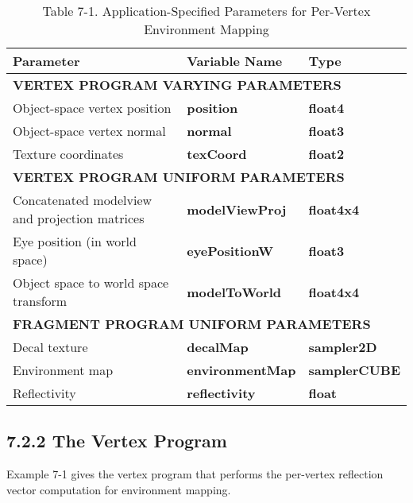 \documentclass[../main.tex]{subfiles}
\begin{document}
\begin{table}
\centering
\begin{tabular}{ p{7cm} p{3cm} p{3cm} } 

Parameter & Variable Name & Type \\
\hline

\multicolumn{3}{p{10cm}}{\textbf{VERTEX PROGRAM VARYING PARAMETERS}}\\

Object-space vertex position & \textbf{position} & \textbf{float4} \\
Object-space vertex normal & \textbf{normal} & \textbf{float3} \\
Texture coordinates & \textbf{texCoord} & \textbf{float2} \\

\hline

\multicolumn{3}{p{10cm}}{\textbf{VERTEX PROGRAM UNIFORM PARAMETERS}}\\

Concatenated modelview and projection matrices & \textbf{modelViewProj} & \textbf{float4x4} \\
Eye position (in world space) & \textbf{eyePositionW} & \textbf{float3} \\
Object space to world space transform & \textbf{modelToWorld} & \textbf{float4x4} \\

\hline

\multicolumn{3}{p{10cm}}{\textbf{FRAGMENT PROGRAM UNIFORM PARAMETERS}}\\

Decal texture & \textbf{decalMap} & \textbf{sampler2D} \\
Environment map & \textbf{environmentMap} & \textbf{samplerCUBE} \\
Reflectivity & \textbf{reflectivity} &  \textbf{float} \\

\hline

\end{tabular}

\caption{Table 7-1. Application-Specified Parameters for Per-Vertex Environment Mapping}
\label{table:7-1}
\end{table}

\subsection{7.2.2 The Vertex Program}

Example 7-1 gives the vertex program that performs the per-vertex reflection vector computation for environment mapping.
\end{document}
